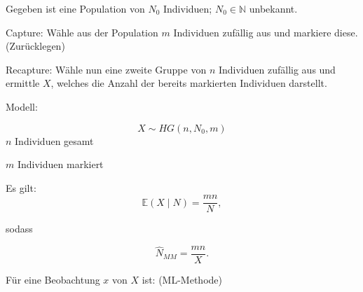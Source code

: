 \documentclass[10pt]{article}
\newcommand{\EW}{\mathbb{E}} %
\newenvironment{BSP}[1][]
{\begin{Beispiel}[frametitle=#1]}{\end{Beispiel}}
\begin{document}
	\begin{BSP}[Beispiel 1.3.9 (Schätzung der Populationsgröße mit der Capture/Recapture-Methode)]
		Gegeben ist eine Population von $N_0$ Individuen; $N_0 \in \mathbb{N}$ unbekannt. 
		
		Capture: Wähle aus der Population $m$ Individuen zufällig aus und markiere diese. (Zurücklegen)
		
		Recapture: Wähle nun eine zweite Gruppe von $n$ Individuen zufällig aus und ermittle $X$, welches die Anzahl der bereits markierten Individuen darstellt. 
		
		Modell:
		
		\begin{equation*}
			X \sim HG(n,N_0,m)
		\end{equation*}
		$n$ Individuen gesamt
		
		$m$ Individuen markiert
		
		Es gilt:
		\begin{equation*}
			\EW(X \mid N) = \frac{mn}{N},
		\end{equation*}
		
		sodass
		
		\begin{equation*}
			\hat{N}_{MM}=\frac{mn}{X}.
		\end{equation*}
		
		Für eine Beobachtung $x$ von $X$ ist: (ML-Methode)
		

\end{BSP}
\end{document}

